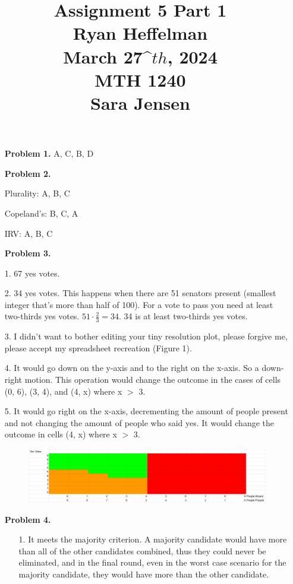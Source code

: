 \documentclass[16pt]{article}
\begin{document}
\large
\date{}
\title{\Large Assignment 5 Part 1 \\ Ryan Heffelman \\ March 27^\(th\), 2024 \\ MTH 1240 \\ Sara Jensen}
\maketitle
    \begin{enumerate}
        \item[\textbf{Problem 1.}] A, C, B, D
        \item[\textbf{Problem 2.}]
        \item[Plurality:] A, B, C
        \item[Copeland's:] B, C, A
        \item[IRV:] A, B, C
        \item[\textbf{Problem 3.}]
        \item[1.] 67 yes votes.
        \item[2.] 34 yes votes. This happens when there are 51 senators present (smallest integer that's more than half of 100). For a vote to pass you need at least two-thirds yes votes. \(51 \cdot \frac{2}{3} = 34\). 34 is at least two-thirds yes votes.
        \item[3.] I didn't want to bother editing your tiny resolution plot, please forgive me, please accept my spreadsheet recreation (Figure 1).
        \item[4.] It would go down on the y-axis and to the right on the x-axis. So a down-right motion. This operation would change the outcome in the cases of cells (0, 6), (3, 4), and (4, x) where x \(>\) 3.
        \item[5.] It would go right on the x-axis, decrementing the amount of people present and not changing the amount of people who said yes. It would change the outcome in cells (4, x) where x \(>\) 3.
        \begin{figure}
            \centering
            \caption{}
            \includegraphics[width=1\linewidth]{image.png}
            \label{Figure 1}
        \end{figure}
        \item[\textbf{Problem 4.}]
        \begin{enumerate}
            \item[1.] It meets the majority criterion. A majority candidate would have more than all of the other candidates combined, thus they could never be eliminated, and in the final round, even in the worst case scenario for the majority candidate, they would have more than the other candidate.
            

\end{enumerate}
\end{enumerate}
\end{document}
